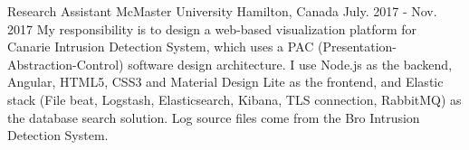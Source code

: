 \begin{cventries}
  \cventry
    {Research Assistant} %
    {McMaster University} %
    {Hamilton, Canada} %
    {July. 2017 - Nov. 2017} %
    {My responsibility is to design a web-based visualization platform for Canarie Intrusion Detection System, which uses a PAC (Presentation-Abstraction-Control) software design architecture. I use Node.js as the backend, Angular, HTML5, CSS3 and Material Design Lite as the frontend, and Elastic stack (File beat, Logstash, Elasticsearch, Kibana, TLS connection, RabbitMQ) as the database search solution. Log source files come from the Bro Intrusion Detection System. 
    }
\end{cventries}
